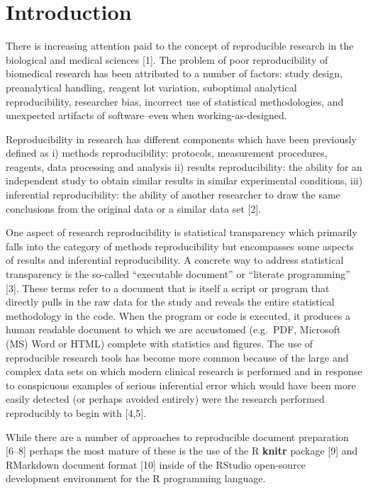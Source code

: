 \documentclass[]{elsarticle} %
\begin{document}
\hypertarget{introduction}{%
\section{Introduction}\label{introduction}}

There is increasing attention paid to the concept of reproducible
research in the biological and medical sciences {[}1{]}. The problem of
poor reproducibility of biomedical research has been attributed to a
number of factors: study design, preanalytical handling, reagent lot
variation, suboptimal analytical reproducibility, researcher bias,
incorrect use of statistical methodologies, and unexpected artifacts of
software--even when working-as-designed.

Reproducibility in research has different components which have been
previously defined as i) methods reproducibility: protocols, measurement
procedures, reagents, data processing and analysis ii) results
reproducibility: the ability for an independent study to obtain similar
results in similar experimental conditions, iii) inferential
reproducibility: the ability of another researcher to draw the same
conclusions from the original data or a similar data set {[}2{]}.

One aspect of research reproducibility is statistical transparency which
primarily falls into the category of methods reproducibility but
encompasses some aspects of results and inferential reproducibility. A
concrete way to address statistical transparency is the so-called
``executable document'' or ``literate programming'' {[}3{]}. These terms
refer to a document that is itself a script or program that directly
pulls in the raw data for the study and reveals the entire statistical
methodology in the code. When the program or code is executed, it
produces a human readable document to which we are accustomed (e.g.~PDF,
Microsoft (MS) Word or HTML) complete with statistics and figures. The
use of reproducible research tools has become more common because of the
large and complex data sets on which modern clinical research is
performed and in response to conspicuous examples of serious inferential
error which would have been more easily detected (or perhaps avoided
entirely) were the research performed reproducibly to begin with
{[}4,5{]}.

While there are a number of approaches to reproducible document
preparation {[}6--8{]} perhaps the most mature of these is the use of
the R \textbf{knitr} package {[}9{]} and RMarkdown document format
{[}10{]} inside of the RStudio open-source development environment for
the R programming language.
\end{document}
